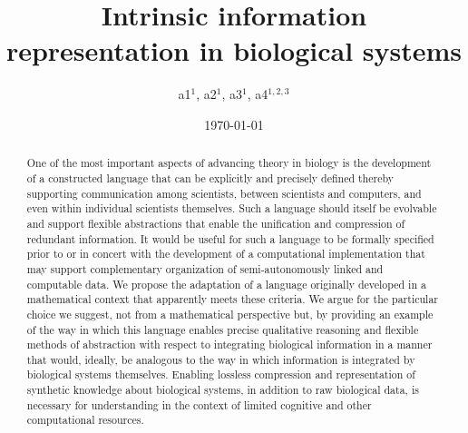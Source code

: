 \documentclass[aps,twocolumn]{revtex4-1}
\begin{document}
 

\title{\bf Intrinsic information representation in biological systems}

\author{a1$^{1}$, a2$^{1}$, a3$^{1}$, a4$^{1,2,3}$}


\date{\today}
\begin{abstract}
One of the most important aspects of advancing theory in biology is the development of a constructed language that can be explicitly and precisely defined thereby supporting communication among scientists, between scientists and computers, and even within individual scientists themselves. Such a language should itself be evolvable and support flexible abstractions that enable the unification and compression of redundant information. It would be useful for such a language to be formally specified prior to or in concert with the development of a computational implementation that may support complementary organization of semi-autonomously linked and computable data. We propose the adaptation of a language originally developed in a mathematical context that apparently meets these criteria. We argue for the particular choice we suggest, not from a mathematical perspective but, by providing an example of the way in which this language enables precise qualitative reasoning and flexible methods of abstraction with respect to integrating biological information in a manner that would, ideally, be analogous to the way in which information is integrated by biological systems themselves. Enabling lossless compression and representation of synthetic knowledge about biological systems, in addition to raw biological data, is necessary for understanding in the context of limited cognitive and other computational resources.
\end{abstract}

\maketitle

\tableofcontents
\end{document}
